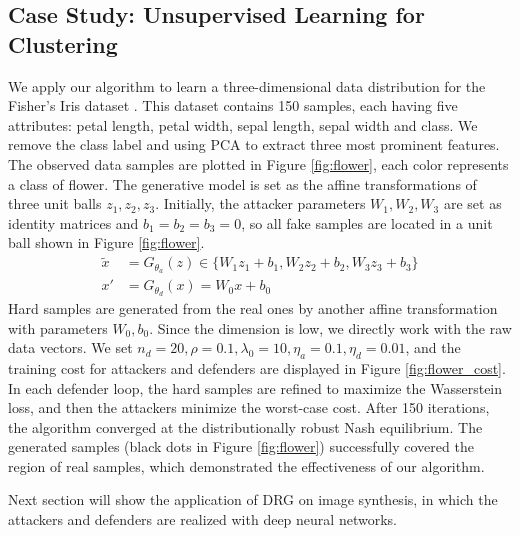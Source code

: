 \documentclass{article}
\begin{document}
\subsection{Case Study: Unsupervised Learning for Clustering}
We apply our algorithm to learn a three-dimensional data distribution for the Fisher's Iris dataset \cite{Lichman:2013}. This dataset contains 150 samples, each having five attributes: petal length, petal width, sepal length, sepal width and class. We remove the class label and using PCA to extract three most prominent features. The observed data samples are plotted in Figure \ref{fig:flower}, each color represents a class of flower. The generative model is set as the affine transformations of three unit balls $z_1, z_2, z_3$. Initially, the attacker parameters $W_1, W_2, W_3$ are set as identity matrices and $b_1 = b_2 = b_3 = 0$, so all fake samples are located in a unit ball shown in Figure \ref{fig:flower}.
\begin{equation*}
\begin{aligned}
\tilde{x} &= G_{\theta_a}(z) \in \{ W_1 z_1 + b_1, W_2 z_2 + b_2, W_3 z_3 + b_3 \} \\
x' &= G_{\theta_d}(x) = W_0 x + b_0
\end{aligned}
\end{equation*}
Hard samples are generated from the real ones by another affine transformation with parameters $W_0, b_0$. Since the dimension is low, we directly work with the raw data vectors. We set $n_d = 20, \rho = 0.1, \lambda_0 = 10, \eta_a = 0.1, \eta_d = 0.01$, and the training cost for attackers and defenders are displayed in Figure \ref{fig:flower_cost}. In each defender loop, the hard samples are refined to maximize the Wasserstein loss, and then the attackers minimize the worst-case cost. After 150 iterations, the algorithm converged at the distributionally robust Nash equilibrium. The generated samples (black dots in Figure \ref{fig:flower}) successfully covered the region of real samples, which demonstrated the effectiveness of our algorithm.

Next section will show the application of DRG on image synthesis, in which the attackers and defenders are realized with deep neural networks.

\end{document}
